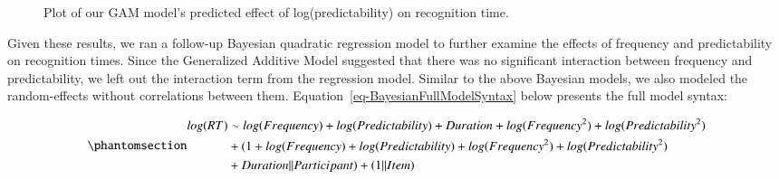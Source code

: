 \documentclass[
  authoryear,
  preprint,
  1p,
  onecolumn]{elsarticle}
\begin{document}
\begin{figure}


\caption{\label{fig-gammodelinterplot}Plot of our GAM model's predicted
effect of log(predictability) on recognition time.}

\end{figure}%

Given these results, we ran a follow-up Bayesian quadratic regression
model to further examine the effects of frequency and predictability on
recognition times. Since the Generalized Additive Model suggested that
there was no significant interaction between frequency and
predictability, we left out the interaction term from the regression
model. Similar to the above Bayesian models, we also modeled the
random-effects without correlations between them.
Equation~\ref{eq-BayesianFullModelSyntax} below presents the full model
syntax:

\begin{equation}\phantomsection\label{eq-BayesianFullModelSyntax}{
\begin{aligned}
log(RT) & \sim  log(Frequency) + log(Predictability) + Duration + log(Frequency^2)  + log(Predictability^2) \\ & + (1 + log(Frequency) + log(Predictability) + log(Frequency^2) + log(Predictability^2) \\& + Duration || Participant) + (1 || Item)
\end{aligned}
}\end{equation}
\end{document}
